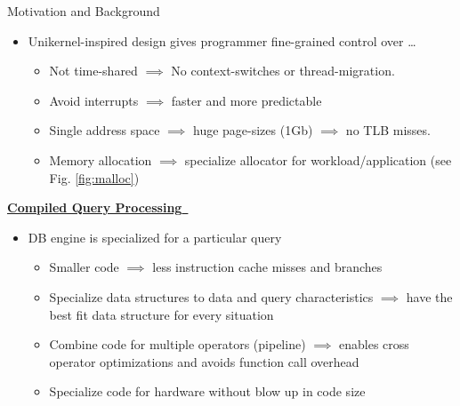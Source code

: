 \begin{block}{Motivation and Background}
\begin{itemize}
    \item {Unikernel-inspired design gives programmer fine-grained control over \ldots}
      \begin{itemize}
      \item Not time-shared $\implies$ No context-switches or thread-migration.
      \item Avoid interrupts $\implies$ faster and more predictable
      \item Single address space $\implies$ huge page-sizes (1Gb) $\implies$ no TLB misses.
      \item Memory allocation $\implies$ specialize allocator for workload/application (see Fig. \ref{fig:malloc})
      \end{itemize}
    \end{itemize}
  
    \underline{\textbf{Compiled Query Processing}~\cite{SK16,N11}}
    \begin{itemize}
    \item DB engine is specialized for a particular query
      \begin{itemize}
      \item Smaller code $\implies$ less instruction cache misses and branches
      \item Specialize data structures to data and query characteristics $\implies$ have the best fit data structure for every situation
      \item Combine code for multiple operators (pipeline) $\implies$ enables cross operator optimizations and avoids function call overhead
      \item Specialize code for hardware without blow up in code size
      \end{itemize}
    \end{itemize}
\end{block}


